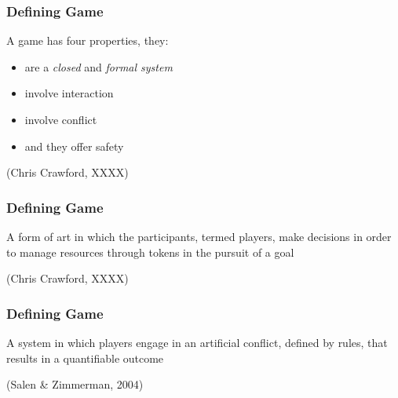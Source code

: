 \documentclass[handout, xcolor={dvipsnames}]{beamer}\usepackage{etoolbox}\newtoggle{printable}\toggletrue{printable}
\begin{document}
\begin{frame}
	\frametitle{Defining Game}
		
	\begin{large}
	A game has four properties, they:
	
	\begin{itemize}
		\item are a \textit{closed} and \textit{formal system}
		\item involve interaction
		\item involve conflict
		\item and they offer safety
	\end{itemize}
	
	\end{large}
	
	\vspace{1em}
	
	\begin{center}
	(Chris Crawford, XXXX)
	\end{center}

\end{frame}

\begin{frame}
	\frametitle{Defining Game}
		
	\begin{center}
	\begin{huge}
	A form of art in which the participants, termed players, make decisions in order to manage resources through tokens in the pursuit of a goal
	\end{huge}
	
	\vspace{3em}
	
	(Chris Crawford, XXXX)
	\end{center}

\end{frame}

\begin{frame}
	\frametitle{Defining Game}
		
	\begin{center}
	\begin{huge}
	A system in which players engage in an artificial conflict, defined by rules, that results in a quantifiable outcome
	\end{huge}
	
	\vspace{3em}
	
	(Salen \& Zimmerman, 2004)
	\end{center}

\end{frame}
\end{document}
